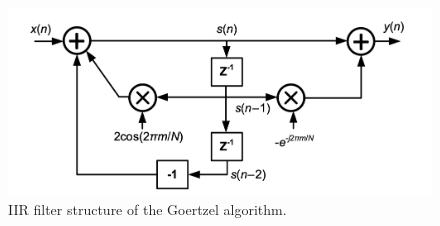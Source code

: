 
\begin{figure}
    \centering
    \includegraphics[width = 12cm]{img/gf_overview.png}
    \caption{IIR filter structure of the Goertzel algorithm. \cite{9464344}}
    \label{fig:gf_overview}
\end{figure}